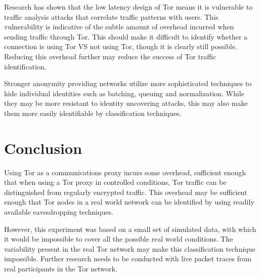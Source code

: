 Research has shown that the low latency design of Tor means it is vulnerable to
traffic analysis attacks that correlate traffic patterns with users. This
vulnerability is indicative of the subtle amount of overhead incurred when
sending traffic through Tor. This should make it difficult to identify whether a
connection is using Tor VS not using Tor, though it is clearly still possible.
Reducing this overhead further may reduce the success of Tor traffic
identification.

Stronger anonymity providing networks utilize more sophisticated techniques to
hide individual identities such as batching, queuing and normalization. While
they may be more resistant to identity uncovering attacks, this may also make
them more easily identifiable by classification techniques.

\section{Conclusion}

Using Tor as a communications proxy incurs some overhead, sufficient enough that
when using a Tor proxy in controlled conditions, Tor traffic can be
distinguished from regularly encrypted traffic. This overhead may be sufficient
enough that Tor nodes in a real world network can be identified by using readily
available eavesdropping techniques.

However, this experiment was based on a small set of simulated data, with which
it would be impossible to cover all the possible real world conditions. The
variability present in the real Tor network may make this classification
technique impossible. Further research needs to be conducted with live packet
traces from real participants in the Tor network.
